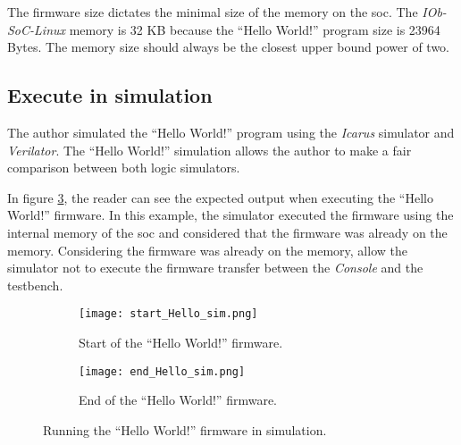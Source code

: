The firmware size dictates the minimal size of the memory on the \acrshort{soc}. The \textit{IOb-SoC-Linux} memory is 32 KB because the \enquote{Hello World!} program size is 23964 Bytes. The memory size should always be the closest upper bound power of two.

\subsection{Execute in simulation}
The author simulated the \enquote{Hello World!} program using the \textit{Icarus} simulator and \textit{Verilator}. The \enquote{Hello World!} simulation allows the author to make a fair comparison between both logic simulators.

In figure \ref{fig:hello_sim}, the reader can see the expected output when executing the \enquote{Hello World!} firmware. In this example, the simulator executed the firmware using the internal memory of the \acrshort{soc} and considered that the firmware was already on the memory. Considering the firmware was already on the memory, allow the simulator not to execute the firmware transfer between the \textit{Console} and the testbench.

\begin{figure}[!ht]
    \centering
    \begin{subfigure}[b]{0.49\textwidth}
        \centering
        \texttt{[image: start\_Hello\_sim.png]}
        \caption{Start of the \enquote{Hello World!} firmware.}
        \label{fig:start_hello_sim}
    \end{subfigure}
    \hfill
    \begin{subfigure}[b]{0.49\textwidth}
        \centering
        \texttt{[image: end\_Hello\_sim.png]}
        \caption{End of the \enquote{Hello World!} firmware.}
        \label{fig:end_hello_sim}
    \end{subfigure}
    \caption{Running the \enquote{Hello World!} firmware in simulation.}
    \label{fig:hello_sim}
\end{figure}

